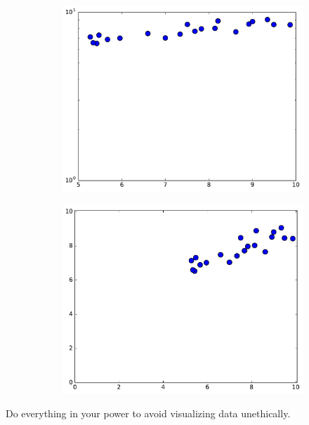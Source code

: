 \begin{figure}[H]
\begin{subfigure}{.495\textwidth}
    \includegraphics[width=\linewidth]{figures/dishonest_3.pdf}
\end{subfigure}
%
\begin{subfigure}{.495\textwidth}
    \centering
    \includegraphics[width=\linewidth]{figures/honest.pdf}
\end{subfigure}
\end{figure}

Do everything in your power to avoid visualizing data unethically.

